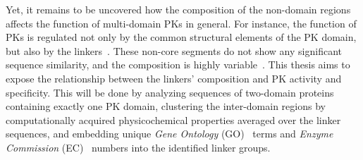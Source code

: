   Yet, it remains to be uncovered how the composition of the non-domain regions affects
  the function of multi-domain PKs in general.
  For instance, the function of PKs is regulated not only by the common structural
  elements of the PK domain, but also by the linkers~\cite{gogl2019disordered}.
  These non-core segments do not show any significant sequence similarity, and the
  composition is highly variable~\cite{taylor1994three}.
  This thesis aims to expose the relationship between the linkers' composition and PK
  activity and specificity.
  This will be done by analyzing sequences of two-domain proteins containing exactly
  one PK domain, clustering the inter-domain regions by computationally acquired
  physicochemical properties averaged over the linker sequences, and embedding unique
  \emph{Gene Ontology} (GO)~\cite{ashburner2000gene, gene2019gene} terms and \emph{Enzyme
  Commission} (EC)~\cite{webb1992enzyme, jeske2019brenda} numbers into the identified
  linker groups.
